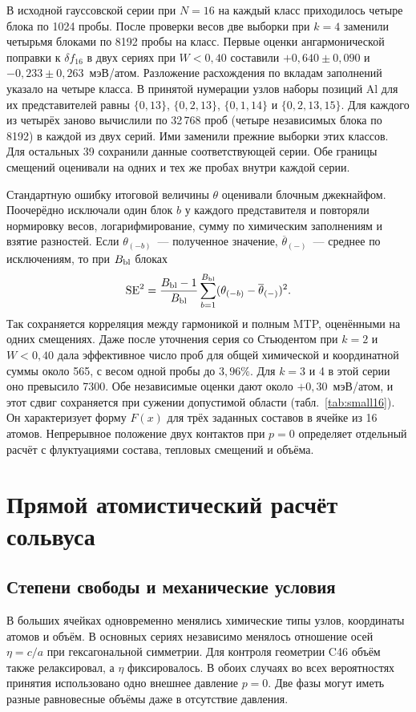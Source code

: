 \documentclass[11pt,a4paper]{article}
\begin{document}
В исходной гауссовской серии при $N=16$ на каждый класс
приходилось четыре блока по 1024 пробы. После проверки весов две выборки
при $k=4$ заменили четырьмя блоками по 8192 пробы на класс. Первые оценки ангармонической поправки к
$\delta f_{16}$ в двух сериях при $W<0{,}40$ составили $+0{,}640\pm0{,}090$
и $-0{,}233\pm0{,}263$~мэВ/атом. Разложение расхождения по вкладам заполнений
указало на четыре класса. В принятой нумерации узлов наборы позиций Al для
их представителей равны $\{0,13\}$, $\{0,2,13\}$, $\{0,1,14\}$ и
$\{0,2,13,15\}$. Для каждого из четырёх заново вычислили по 32\,768 проб
(четыре независимых блока по 8192) в каждой из двух серий. Ими заменили
прежние выборки этих классов. Для остальных 39 сохранили данные
соответствующей серии. Обе границы смещений оценивали на одних и тех же
пробах внутри каждой серии.

Стандартную ошибку итоговой величины $\theta$ оценивали блочным
джекнайфом. Поочерёдно исключали один блок $b$ у каждого представителя
и повторяли нормировку весов, логарифмирование, сумму по химическим
заполнениям и взятие разностей. Если $\theta_{(-b)}$~--- полученное
значение, $\overline{\theta}_{(-)}$~--- среднее по исключениям, то при
$B_{\rm bl}$ блоках
\[
 {\rm SE}^2=\frac{B_{\rm bl}-1}{B_{\rm bl}}
 \sum_{b=1}^{B_{\rm bl}}(\theta_{(-b)}-\overline{\theta}_{(-)})^2 .
\]
Так сохраняется корреляция между гармоникой и полным MTP, оценёнными на
одних смещениях. Даже после уточнения серия со Стьюдентом при $k=2$ и
$W<0{,}40$ дала эффективное число проб для общей химической и координатной
суммы около 565, с весом одной пробы до $3{,}96\%$. Для $k=3$ и 4
в этой серии оно превысило 7300. Обе независимые оценки дают около
$+0{,}30$~мэВ/атом, и этот сдвиг сохраняется при сужении допустимой
области (табл.~\ref{tab:small16}). Он характеризует
форму $F(x)$ для трёх заданных составов в ячейке из 16 атомов. Непрерывное
положение двух контактов при $p=0$ определяет отдельный расчёт с флуктуациями
состава, тепловых смещений и объёма.

\section{Прямой атомистический расчёт сольвуса}
\label{sec:ensemble}

\subsection{Степени свободы и механические условия}
В больших ячейках одновременно менялись химические типы узлов, координаты
атомов и объём. В основных сериях независимо менялось отношение осей
\(\eta=c/a\) при гексагональной симметрии. Для контроля геометрии C46
объём также релаксировал, а \(\eta\) фиксировалось. В обоих случаях
во всех вероятностях принятия использовано одно внешнее давление \(p=0\).
Две фазы могут иметь разные равновесные объёмы даже в отсутствие давления.
\end{document}
